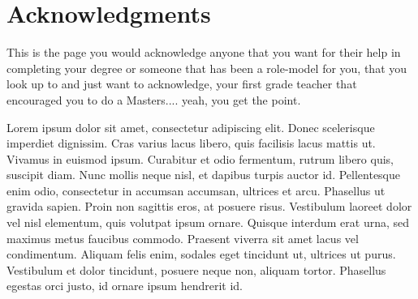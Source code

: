 
\chapter*{Acknowledgments}

This is the page you would acknowledge anyone that you want for their help in completing your degree or someone that has been a role-model for you, that you look up to and just want to acknowledge, your first grade teacher that encouraged you to do a Masters.... yeah, you get the point.


Lorem ipsum dolor sit amet, consectetur adipiscing elit. Donec scelerisque imperdiet dignissim. Cras varius lacus libero, quis facilisis lacus mattis ut. Vivamus in euismod ipsum. Curabitur et odio fermentum, rutrum libero quis, suscipit diam. Nunc mollis neque nisl, et dapibus turpis auctor id. Pellentesque enim odio, consectetur in accumsan accumsan, ultrices et arcu. Phasellus ut gravida sapien. Proin non sagittis eros, at posuere risus. Vestibulum laoreet dolor vel nisl elementum, quis volutpat ipsum ornare. Quisque interdum erat urna, sed maximus metus faucibus commodo. Praesent viverra sit amet lacus vel condimentum. Aliquam felis enim, sodales eget tincidunt ut, ultrices ut purus. Vestibulum et dolor tincidunt, posuere neque non, aliquam tortor. Phasellus egestas orci justo, id ornare ipsum hendrerit id.
